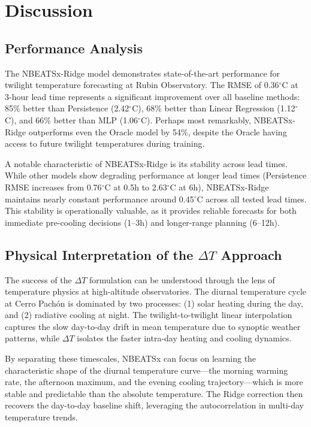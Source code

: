 \documentclass[11pt]{article}
\begin{document}
\section{Discussion}

\subsection{Performance Analysis}

The NBEATSx-Ridge model demonstrates state-of-the-art performance for twilight temperature forecasting at Rubin Observatory. The RMSE of 0.36$^\circ$C at 3-hour lead time represents a significant improvement over all baseline methods: 85\% better than Persistence (2.42$^\circ$C), 68\% better than Linear Regression (1.12$^\circ$C), and 66\% better than MLP (1.06$^\circ$C). Perhaps most remarkably, NBEATSx-Ridge outperforms even the Oracle model by 54\%, despite the Oracle having access to future twilight temperatures during training.

A notable characteristic of NBEATSx-Ridge is its stability across lead times. While other models show degrading performance at longer lead times (Persistence RMSE increases from 0.76$^\circ$C at 0.5h to 2.63$^\circ$C at 6h), NBEATSx-Ridge maintains nearly constant performance around 0.45$^\circ$C across all tested lead times. This stability is operationally valuable, as it provides reliable forecasts for both immediate pre-cooling decisions (1--3h) and longer-range planning (6--12h).

\subsection{Physical Interpretation of the \texorpdfstring{$\Delta T$}{Delta T} Approach}

The success of the $\Delta T$ formulation can be understood through the lens of temperature physics at high-altitude observatories. The diurnal temperature cycle at Cerro Pach\'on is dominated by two processes: (1) solar heating during the day, and (2) radiative cooling at night. The twilight-to-twilight linear interpolation captures the slow day-to-day drift in mean temperature due to synoptic weather patterns, while $\Delta T$ isolates the faster intra-day heating and cooling dynamics.

By separating these timescales, NBEATSx can focus on learning the characteristic shape of the diurnal temperature curve---the morning warming rate, the afternoon maximum, and the evening cooling trajectory---which is more stable and predictable than the absolute temperature. The Ridge correction then recovers the day-to-day baseline shift, leveraging the autocorrelation in multi-day temperature trends.
\end{document}

